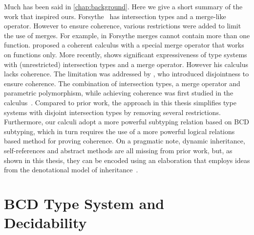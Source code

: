 Much has been said in \cref{chap:background}. Here we give a short summary of
the work that inspired ours. Forsythe~\citep{reynolds1988preliminary} has
intersection types and a merge-like operator. However to ensure coherence,
various restrictions were added to limit the use of merges. For example, in
Forsythe merges cannot contain more than one function. \citet{Castagna_1992}
proposed a coherent calculus with a special merge operator that works on
functions only. More recently, \citet{dunfield2014elaborating} shows significant
expressiveness of type systems with (unrestricted) intersection types and a
merge operator. However his calculus lacks coherence. The limitation was
addressed by \citet{oliveira2016disjoint}, who introduced disjointness to ensure
coherence. The combination of intersection types, a merge operator and
parametric polymorphism, while achieving coherence was first studied in the
\fname calculus~\citep{alpuimdisjoint}. Compared to prior work, the approach in
this thesis simplifies type systems with disjoint intersection types by removing
several restrictions. Furthermore, our calculi adopt a more powerful subtyping
relation based on BCD subtyping, which in turn requires the use of a more
powerful logical relations based method for proving coherence. On a pragmatic
note, dynamic inheritance, self-references and abstract methods are all missing
from prior work, but, as shown in this thesis, they can be encoded using an
elaboration that employs ideas from the denotational model of
inheritance~\citep{cook1989denotational}.






\section {BCD Type System and Decidability}

